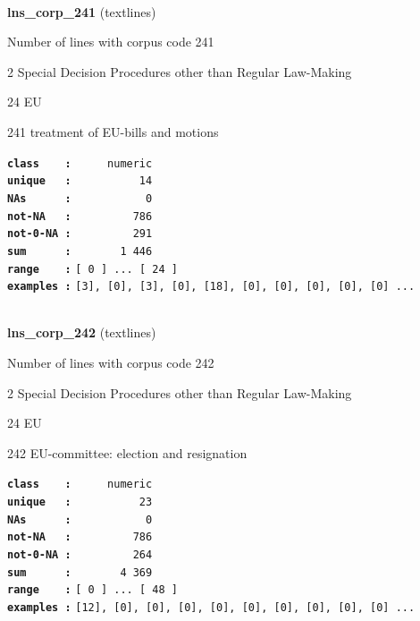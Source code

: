 \documentclass[]{article}
\begin{document}
~

\textbf{lns\_corp\_241} (textlines)

Number of lines with corpus code 241

2 Special Decision Procedures other than Regular Law-Making

24 EU

241 treatment of EU-bills and motions

\textbf{\texttt{class\ \ \ \ :}} \texttt{~~~~~numeric}\\
\textbf{\texttt{unique\ \ \ :}} \texttt{~~~~~~~~~~14}\\
\textbf{\texttt{NAs\ \ \ \ \ \ :}} \texttt{~~~~~~~~~~~0}\\
\textbf{\texttt{not-NA\ \ \ :}} \texttt{~~~~~~~~~786}\\
\textbf{\texttt{not-0-NA\ :}} \texttt{~~~~~~~~~291}\\
\textbf{\texttt{sum\ \ \ \ \ \ :}} \texttt{~~~~~~~1~446}\\
\textbf{\texttt{range\ \ \ \ :}}
\texttt{{[}\ 0\ {]}\ ...\ {[}\ 24\ {]}}\\
\textbf{\texttt{examples\ :}}
\texttt{{[}3{]},\ {[}0{]},\ {[}3{]},\ {[}0{]},\ {[}18{]},\ {[}0{]},\ {[}0{]},\ {[}0{]},\ {[}0{]},\ {[}0{]}\ ...}\\

~

\textbf{lns\_corp\_242} (textlines)

Number of lines with corpus code 242

2 Special Decision Procedures other than Regular Law-Making

24 EU

242 EU-committee: election and resignation

\textbf{\texttt{class\ \ \ \ :}} \texttt{~~~~~numeric}\\
\textbf{\texttt{unique\ \ \ :}} \texttt{~~~~~~~~~~23}\\
\textbf{\texttt{NAs\ \ \ \ \ \ :}} \texttt{~~~~~~~~~~~0}\\
\textbf{\texttt{not-NA\ \ \ :}} \texttt{~~~~~~~~~786}\\
\textbf{\texttt{not-0-NA\ :}} \texttt{~~~~~~~~~264}\\
\textbf{\texttt{sum\ \ \ \ \ \ :}} \texttt{~~~~~~~4~369}\\
\textbf{\texttt{range\ \ \ \ :}}
\texttt{{[}\ 0\ {]}\ ...\ {[}\ 48\ {]}}\\
\textbf{\texttt{examples\ :}}
\texttt{{[}12{]},\ {[}0{]},\ {[}0{]},\ {[}0{]},\ {[}0{]},\ {[}0{]},\ {[}0{]},\ {[}0{]},\ {[}0{]},\ {[}0{]}\ ...}\\
\end{document}
